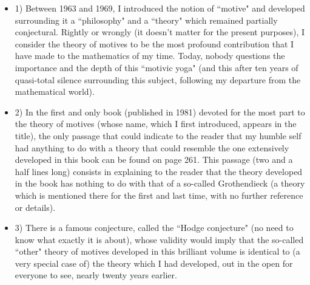 \begin{itemize}

\item 1) Between 1963 and 1969, I introduced the notion of ``motive" and developed surrounding it a ``philosophy" and a ``theory" which remained partially conjectural. Rightly or wrongly (it doesn't matter for the present purposes), I consider the theory of motives to be the most profound contribution that I have made to the mathematics of my time. Today, nobody questions the importance and the depth of this ``motivic yoga" (and this after ten years of quasi-total silence surrounding this subject, following my departure from the mathematical world).

\item 2) In the first and only book (published in 1981) devoted for the most part to the theory of motives (whose name, which I first introduced, appears in the title), the only passage that could indicate to the reader that my humble self had anything to do with a theory that could resemble the one extensively developed in this book can be found on page 261. This passage (two and a half lines long) consists in explaining to the reader that the theory developed in the book has nothing to do with that of a so-called Grothendieck (a theory which is mentioned there for the first and last time, with no further reference or details).

\item 3) There is a famous conjecture, called the ``Hodge conjecture" (no need to know what exactly it is about), whose validity would imply that the so-called ``other" theory of motives developed in this brilliant volume is identical to (a very special case of) the theory which I had developed, out in the open for everyone to see, nearly twenty years earlier.
\end{itemize}

